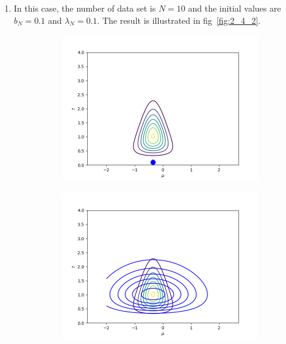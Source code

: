 \documentclass[11pt]{extarticle}
\newcommand{\0}{\mathbf{0}}
\renewcommand{\(}{\left(}
\renewcommand{\)}{\right)}
\theoremstyle{definition}
\begin{document}
\begin{enumerate}
	\item In this case, the number of data set is $N = 10$ and the initial values are $b_{N} = 0.1$ and $\lambda_{N} = 0.1$. The result is illustrated in fig~\ref{fig:2_4_2}.
	\begin{figure}[!ht]
		\centering
		\begin{subfigure}{.4\textwidth}
			\centering
			\includegraphics[width=\linewidth]{2_4_2_1}
		\end{subfigure}
		\begin{subfigure}{.4\textwidth}
			\centering
			\includegraphics[width=\linewidth]{2_4_2_2}
		\end{subfigure}
		\begin{subfigure}{.4\textwidth}

\end{subfigure}
\end{figure}
\end{enumerate}
\end{document}
